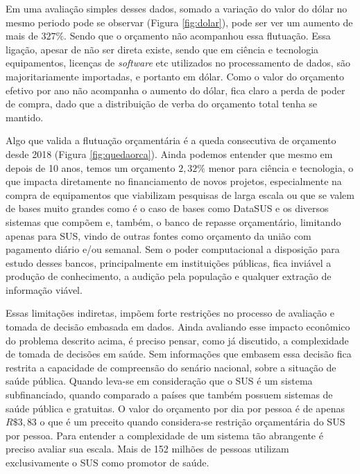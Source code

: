 Em uma avaliação simples desses dados, somado a variação do valor do dólar no mesmo periodo pode se observar (Figura \ref{fig:dolar}), pode ser ver um aumento de mais de $327\%$. Sendo que o orçamento não acompanhou essa flutuação. Essa ligação, apesar de não ser direta existe, sendo que em ciência e tecnologia equipamentos, licenças de \emph{software} etc utilizados no processamento de dados, são majoritariamente importadas, e portanto em dólar. Como o valor do orçamento efetivo por ano não acompanha o aumento do dólar, fica claro a perda de poder de compra, dado que a distribuição de verba do orçamento total tenha se mantido. 

Algo que valida a flutuação orçamentária é a queda consecutiva de orçamento desde 2018 (Figura \ref{fig:quedaorca}). Ainda podemos entender que mesmo em depois de 10 anos, temos um orçamento $2,32\%$ menor para ciência e tecnologia, o que impacta diretamente no financiamento de novos projetos, especialmente na compra de equipamentos que viabilizam pesquisas de larga escala ou que se valem de bases muito grandes como é o caso de bases como DataSUS e os diversos sistemas que compõem e, também, o banco de repasse orçamentário, limitando apenas para SUS, vindo de outras fontes como orçamento da união com pagamento diário e/ou semanal. Sem o poder computacional a disposição para estudo desses bancos, principalmente em instituições públicas, fica inviável a produção de conhecimento, a audição pela população e qualquer extração de informação viável. 

Essas limitações indiretas, impõem forte restrições no processo de avaliação e tomada de decisão embasada em dados. Ainda avaliando esse impacto econômico do problema descrito acima, é preciso pensar, como já discutido, a complexidade de tomada de decisões em saúde. Sem informações que embasem essa decisão fica restrita a capacidade de compreensão do senário nacional, sobre a situação de saúde pública. Quando leva-se em consideração que o SUS é um sistema subfinanciado, quando comparado a países que também possuem sistemas de saúde pública e gratuitas. O valor do orçamento por dia por pessoa é de apenas $R\$ 3,83$  o que é um preceito quando considera-se  restrição orçamentária do SUS por pessoa. Para entender a complexidade de um sistema tão abrangente é preciso avaliar sua escala. Mais de 152 milhões de pessoas utilizam exclusivamente o SUS como promotor de saúde. 


